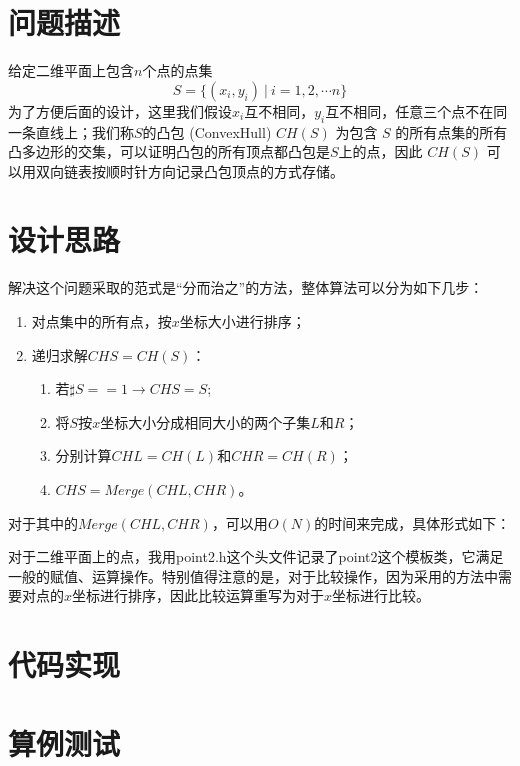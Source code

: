 
\section{问题描述}
给定二维平面上包含$n$个点的点集
\[S = \{(x_i, y_i)\ |\ i = 1,2,\cdots n\}\]
为了方便后面的设计，这里我们假设$x_i$互不相同，$y_i$互不相同，任意三个点不在同一条直线上；我们称$S$的凸包 (ConvexHull) $CH(S)$ 为包含 $S$ 的所有点集的所有凸多边形的交集，可以证明凸包的所有顶点都凸包是$S$上的点，因此 $CH(S)$ 可以用双向链表按顺时针方向记录凸包顶点的方式存储。

\section{设计思路}

解决这个问题采取的范式是“分而治之”的方法，整体算法可以分为如下几步：
\begin{enumerate}
\item 对点集中的所有点，按$x$坐标大小进行排序；
\item 递归求解$CHS = CH(S)$：
  \begin{enumerate}
  \item 若$\sharp S == 1 \rightarrow CHS = S$;
  \item 将$S$按$x$坐标大小分成相同大小的两个子集$L$和$R$；
  \item 分别计算$CHL = CH(L)$和$CHR = CH(R)$；
  \item $CHS = Merge(CHL, CHR)$。
  \end{enumerate}
\end{enumerate}

对于其中的$Merge(CHL, CHR)$，可以用$O(N)$的时间来完成，具体形式如下：
\begin{enumerate}

\end{enumerate}

对于二维平面上的点，我用point2.h这个头文件记录了point2这个模板类，它满足一般的赋值、运算操作。特别值得注意的是，对于比较操作，因为采用的方法中需要对点的$x$坐标进行排序，因此比较运算重写为对于$x$坐标进行比较。

\section{代码实现}

\section{算例测试}
